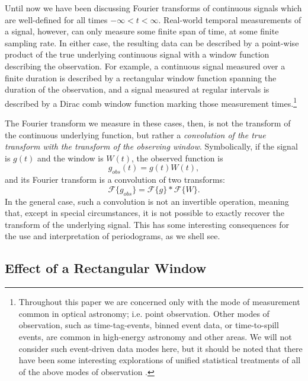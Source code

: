 \documentclass[preprint]{aastex}
\begin{document}
Until now we have been discussing Fourier transforms of continuous signals
which are well-defined for all times $-\infty < t < \infty$.
Real-world temporal measurements of a signal, however, can only measure some
finite span of time, at some finite sampling rate.
In either case, the resulting data can be described by a point-wise product
of the true underlying continuous signal with a window function describing
the observation.
For example, a continuous signal measured over a finite duration is described
by a rectangular window function spanning the duration of the observation,
and a signal measured at regular intervals is described by a Dirac comb window
function marking those measurement times.\footnote{
  Throughout this paper we are concerned only with the mode of measurement
  common in optical astronomy; {i.e.} point observation. Other modes of
  observation, such as time-tag-events, binned event data, or
  time-to-spill events, are common in high-energy astronomy and other areas.
  We will not consider such event-driven data modes here, but it should be
  noted that there have been some interesting explorations of unified
  statistical treatments of all of the above modes of observation
  \citep[e.g.][]{Scargle98, Scargle2002}.
}

The Fourier transform we measure in these cases, then, is not the
transform of the continuous underlying function, but rather a 
{\it convolution of the true transform with the transform of the observing
window}.
Symbolically, if the signal is $g(t)$ and the window is $W(t)$, the observed
function is
\begin{equation}
  g_{obs}(t) = g(t)W(t),
\end{equation}
and its Fourier transform is a convolution of two transforms:
\begin{equation}
  \mathcal{F}\{g_{obs}\} = \mathcal{F}\{g\} \ast \mathcal{F}\{W\}.
\end{equation}
In the general case, such a convolution is not an invertible operation, meaning
that, except in special circumstances, it is not possible to exactly recover
the transform of the underlying signal.
This has some interesting consequences for the use and interpretation of
periodograms, as we shell see.

\subsection{Effect of a Rectangular Window}
\end{document}

